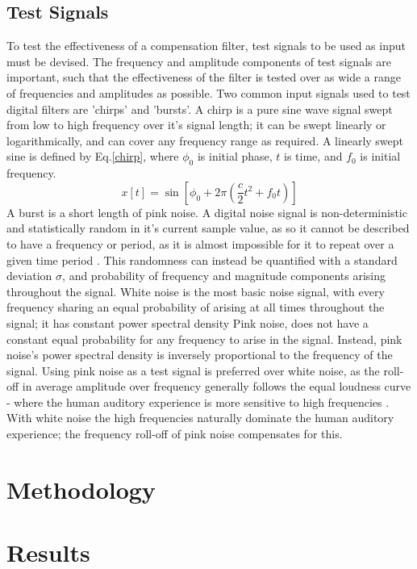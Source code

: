 \documentclass[conference]{IEEEtran}
\begin{document}
    \subsection{Test Signals}
        To test the effectiveness of a compensation filter, test signals to be used as input must be devised.
        The frequency and amplitude components of test signals are important, such that the effectiveness of the filter is tested over as wide a range of frequencies and amplitudes as possible.
        Two common input signals used to test digital filters are 'chirps' and 'bursts'.
        A chirp is a pure sine wave signal swept from low to high frequency over it's signal length; it can be swept linearly or logarithmically, and can cover any frequency range as required.
        A linearly swept sine is defined by Eq.\ref{chirp}, where $\phi_0$ is initial phase, $t$ is time, and $f_0$ is initial frequency.
        \begin{equation}\label{chirp}
            x[t] = \sin{[\phi_0 + 2\pi(\frac{c}{2} t^2 + f_0 t)]}
        \end{equation}
        A burst is a short length of pink noise.
        A digital noise signal is non-deterministic and statistically random in it's current sample value, as so it cannot be described to have a frequency or period, as it is almost impossible for it to repeat over a given time period \cite{OPPENHEIM376}.
        This randomness can instead be quantified with a standard deviation $\sigma$, and probability of frequency and magnitude components arising throughout the signal.
        White noise is the most basic noise signal, with every frequency sharing an equal probability of arising at all times throughout the signal; it has constant power spectral density \cite{CARTER}
        Pink noise, does not have a constant equal probability for any frequency to arise in the signal.
        Instead, pink noise's power spectral density is inversely proportional to the frequency of the signal.
        Using pink noise as a test signal is preferred over white noise, as the roll-off in average amplitude over frequency generally follows the equal loudness curve - where the human auditory experience is more sensitive to high frequencies \cite{GENELEC}.
        With white noise the high frequencies naturally dominate the human auditory experience; the frequency roll-off of pink noise compensates for this.
\section{Methodology}

\section{Results}



\end{document}
